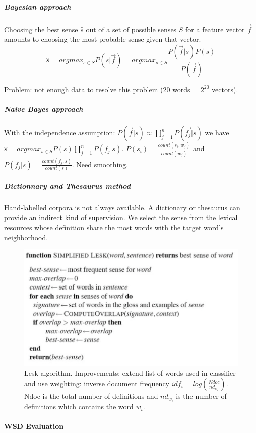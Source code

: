 \subparagraph{Bayesian approach}

Choosing the best sense $\hat{s}$ out of a set of possible senses $S$ for a feature vector $\vec{f}$ amounts to choosing the most probable sense given that vector.
$$\hat{s} = argmax_{s \in S} P(s|\vec{f}) = argmax_{s \in S} \frac{P(\vec{f}|s)P(s)}{P(\vec{f})}$$

Problem: not enough data to resolve this problem (20 words = $2^{20}$ vectors).

\subparagraph{Naive Bayes approach}

With the independence assumption: $P(\vec{f}|s) \approx \prod^{n}_{j=1} P(\vec{f_j}|s)$ we have $\hat{s} = argmax_{s \in S} P(s) \prod^{n}_{j=1} P(f_j|s)$. $P(s_i) = \frac{count(s_i , w_j)}{count(w_j)}$ and $P(f_j|s) = \frac{count(f_j, s)}{count(s)}$. Need smoothing.

\subparagraph{Dictionnary and Thesaurus method}

Hand-labelled corpora is not always available. A dictionary or thesaurus can provide an indirect kind of supervision. We select the sense from the lexical resources whose definition share the most words with the target word's neighborhood.

\begin{figure}[H]
	\centering
	\includegraphics[scale=0.6]{images/68_lesk.png}
 	\caption{Lesk algorithm. Improvements: extend list of words used in classifier and use weighting: inverse document frequency $idf_{i} = log (\frac{Ndoc}{nd_{w_{i}}})$. Ndoc is the total number of definitions and $nd_{w_{i}}$ is the number of definitions which contains the word $w_{i}$.}
\end{figure}

\paragraph{WSD Evaluation}

